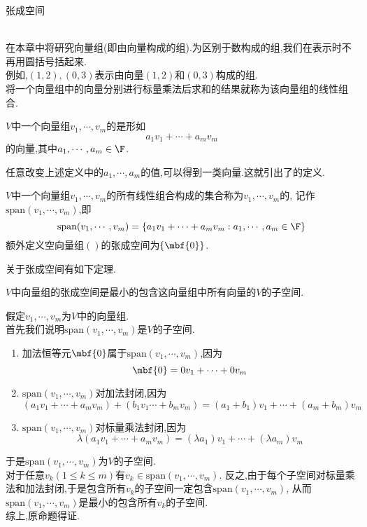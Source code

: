 \documentclass{ctexart}
\begin{document}
\pagestyle{empty}
\begin{center}\large 张成空间\end{center}
\\
在本章中将研究向量组(即由向量构成的组).为区别于数构成的组,我们在表示时不再用圆括号括起来.\\
例如,$(1,2),(0,3)$表示由向量$(1,2)$和$(0,3)$构成的组.\\
将一个向量组中的向量分别进行标量乘法后求和的结果就称为该向量组的线性组合.
\begin{definition}[1.1 定义:线性组合]
    $V$中一个向量组$v_1,\cdots,v_m$的是形如
    $$a_1v_1+\cdots+a_mv_m$$的向量,其中$a_1,\cdots,a_m\in\F$.
\end{definition}\noindent
任意改变上述定义中的$a_1,\cdots,a_m$的值,可以得到一类向量.这就引出了的定义.
\begin{definition}[1.2 定义:张成空间]
    $V$中一个向量组$v_1,\cdots,v_m$的所有线性组合构成的集合称为$v_1,\cdots,v_m$的,
    记作$\text{span}(v_1,\cdots,v_m)$,即
    $$\text{span}(v_1,\cdots,v_m)=\left\{a_1v_1+\cdots+a_mv_m:a_1,\cdots,a_m\in\F\right\}$$
    额外定义空向量组$()$的张成空间为$\left\{\mbf{0}\right\}$.
\end{definition}\noindent
关于张成空间有如下定理.
\begin{formal}[1.3 张成空间的性质]
    $V$中向量组的张成空间是最小的包含这向量组中所有向量的$V$的子空间.
\end{formal}
\begin{solution}[Proof.]
    假定$v_1,\cdots,v_m$为$V$中的向量组.\\
    首先我们说明$\text{span}(v_1,\cdots,v_m)$是$V$的子空间.
    \begin{enumerate}[label=\tbf{(\arabic*)}]
        \item 加法恒等元$\mbf{0}$属于$\text{span}(v_1,\cdots,v_m)$,因为$$\mbf{0}=0v_1+\cdots+0v_m$$
        \item $\text{span}(v_1,\cdots,v_m)$对加法封闭,因为$$(a_1v_1+\cdots+a_mv_m)+(b_1v_1\cdots+b_mv_m)=(a_1+b_1)v_1+\cdots+(a_m+b_m)v_m$$
        \item $\text{span}(v_1,\cdots,v_m)$对标量乘法封闭,因为$$\lambda(a_1v_1+\cdots+a_mv_m)=(\lambda a_1)v_1+\cdots+(\lambda a_m)v_m$$
    \end{enumerate}
    于是$\text{span}(v_1,\cdots,v_m)$为$V$的子空间.\\
    对于任意$v_k(1\leqslant k\leqslant m)$有$v_k\in \text{span}(v_1,\cdots,v_m)$.
    反之,由于每个子空间对标量乘法和加法封闭,于是包含所有$v_k$的子空间一定包含$\text{span}(v_1,\cdots,v_m)$,
    从而$\text{span}(v_1,\cdots,v_m)$是最小的包含所有$v_k$的子空间.\\
    综上,原命题得证.
\end{solution}\noindent
\end{document}
